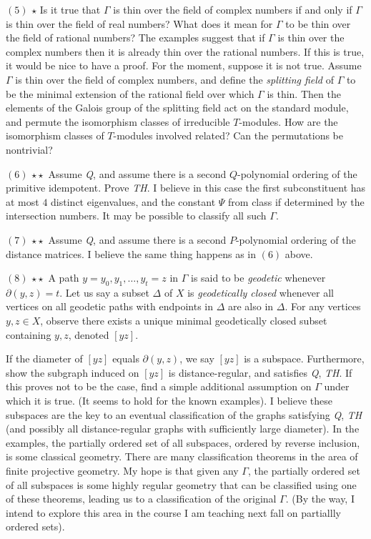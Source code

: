 \documentclass[
]{book}
\theoremstyle{definition}
\theoremstyle{definition}
\theoremstyle{definition}
\theoremstyle{definition}
\theoremstyle{remark}
\begin{document}
\hfill\break
\((5)\) \(\star\) Is it true that \(\Gamma\) is thin over the field of complex numbers if and only if \(\Gamma\) is thin over the field of real numbers? What does it mean for \(\Gamma\) to be thin over the field of rational numbers? The examples suggest that if \(\Gamma\) is thin over the complex numbers then it is already thin over the rational numbers. If this is true, it would be nice to have a proof. For the moment, suppose it is not true. Assume \(\Gamma\) is thin over the field of complex numbers, and define the \emph{splitting field} of \(\Gamma\) to be the minimal extension of the rational field over which \(\Gamma\) is thin. Then the elements of the Galois group of the splitting field act on the standard module, and permute the isomorphism classes of irreducible \(T\)-modules. How are the isomorphism classes of \(T\)-modules involved related? Can the permutations be nontrivial?

\hfill\break
\((6)\) \(\star\star\) Assume \emph{Q}, and assume there is a second \(Q\)-polynomial ordering of the primitive idempotent. Prove \emph{TH}. I believe in this case the first subconstituent has at most \(4\) distinct eigenvalues, and the constant \(\Psi\) from class if determined by the intersection numbers. It may be possible to classify all such \(\Gamma\).

\hfill\break
\((7)\) \(\star\star\) Assume \emph{Q}, and assume there is a second \(P\)-polynomial ordering of the distance matrices. I believe the same thing happens as in \((6)\) above.

\hfill\break
\((8)\) \(\star\star\) A path \(y = y_0, y_1, \ldots, y_t = z\) in \(\Gamma\) is said to be \emph{geodetic} whenever \(\partial(y,z)=t\). Let us say a subset \(\Delta\) of \(X\) is \emph{geodetically closed} whenever all vertices on all geodetic paths with endpoints in \(\Delta\) are also in \(\Delta\). For any vertices \(y,z\in X\), observe there exists a unique minimal geodetically closed subset containing \(y,z\), denoted \([yz]\).

If the diameter of \([yz]\) equals \(\partial(y,z)\), we say \([yz]\) is a subspace. Furthermore, show the subgraph induced on \([yz]\) is distance-regular, and satisfies \emph{Q}, \emph{TH}. If this proves not to be the case, find a simple additional assumption on \(\Gamma\) under which it is true. (It seems to hold for the known examples). I believe these subspaces are the key to an eventual classification of the graphs satisfying \emph{Q}, \emph{TH} (and possibly all distance-regular graphs with sufficiently large diameter). In the examples, the partially ordered set of all subspaces, ordered by reverse inclusion, is some classical geometry. There are many classification theorems in the area of finite projective geometry. My hope is that given any \(\Gamma\), the partially ordered set of all subspaces is some highly regular geometry that can be classified using one of these theorems, leading us to a classification of the original \(\Gamma\). (By the way, I intend to explore this area in the course I am teaching next fall on partiallly ordered sets).
\end{document}
